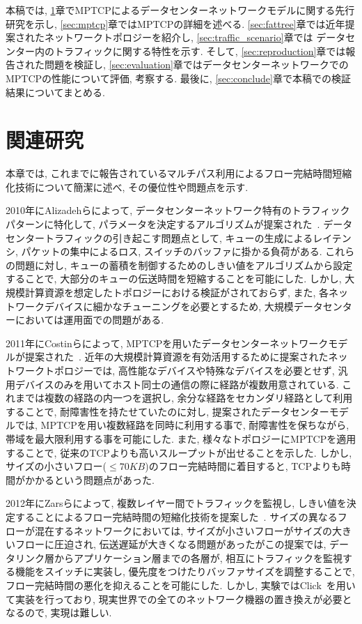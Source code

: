 \documentclass[technicalreport]{ieicej}
\begin{document}
本稿では, \ref{sec:related}章でMPTCPによるデータセンターネットワークモデルに関する先行研究を示し,
\ref{sec:mptcp}章ではMPTCPの詳細を述べる.
\ref{sec:fattree}章では近年提案されたネットワークトポロジーを紹介し, \ref{sec:traffic_scenario}章では
データセンター内のトラフィックに関する特性を示す.
そして, \ref{sec:reproduction}章では報告された問題を検証し,
\ref{sec:evaluation}章ではデータセンターネットワークでのMPTCPの性能について評価, 考察する.
最後に, \ref{sec:conclude}章で本稿での検証結果についてまとめる.

\section{関連研究}
\label{sec:related}
本章では, これまでに報告されているマルチパス利用によるフロー完結時間短縮化技術について簡潔に述べ, その優位性や問題点を示す.

2010年にAlizadehらによって, データセンターネットワーク特有のトラフィックパターンに特化して,
パラメータを決定するアルゴリズムが提案された~\cite{dctcp}.
データセンタートラフィックの引き起こす問題点として, キューの生成によるレイテンシ, パケットの集中によるロス,
スイッチのバッファに掛かる負荷がある.
これらの問題に対し, キューの蓄積を制御するためのしきい値をアルゴリズムから設定することで,
大部分のキューの伝送時間を短縮することを可能にした.
しかし, 大規模計算資源を想定したトポロジーにおける検証がされておらず, また, 各ネットワークデバイスに細かなチューニングを必要とするため,
大規模データセンターにおいては運用面での問題がある.

2011年にCostinらによって, MPTCPを用いたデータセンターネットワークモデルが提案された~\cite{improving}.
近年の大規模計算資源を有効活用するために提案されたネットワークトポロジーでは,
高性能なデバイスや特殊なデバイスを必要とせず, 汎用デバイスのみを用いてホスト同士の通信の際に経路が複数用意されている.
これまでは複数の経路の内一つを選択し, 余分な経路をセカンダリ経路として利用することで, 耐障害性を持たせていたのに対し, 提案されたデータセンターモデルでは,
MPTCPを用い複数経路を同時に利用する事で, 耐障害性を保ちながら, 帯域を最大限利用する事を可能にした.
また, 様々なトポロジーにMPTCPを適用することで, 従来のTCPよりも高いスループットが出せることを示した.
しかし, サイズの小さいフロー($\leq70KB$)のフロー完結時間に着目すると, TCPよりも時間がかかるという問題点があった.

2012年にZarsらによって, 複数レイヤー間でトラフィックを監視し,
しきい値を決定することによるフロー完結時間の短縮化技術を提案した~\cite{detail}.
サイズの異なるフローが混在するネットワークにおいては, サイズが小さいフローがサイズの大きいフローに圧迫され, 伝送遅延が大きくなる問題があったがこの提案では,
データリンク層からアプリケーション層までの各層が, 相互にトラフィックを監視する機能をスイッチに実装し, 優先度をつけたりバッファサイズを調整することで, フロー完結時間の悪化を抑えることを可能にした.
しかし, 実験ではClick~\cite{click}を用いて実装を行っており, 現実世界での全てのネットワーク機器の置き換えが必要となるので, 実現は難しい.
\end{document}
